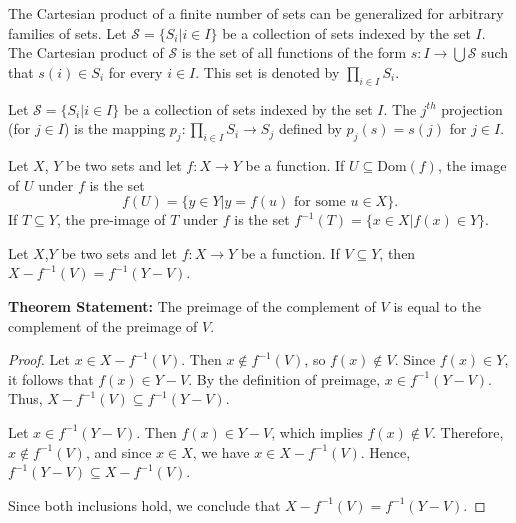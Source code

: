 \documentclass[../main.tex]{subfiles}
\begin{document}
The Cartesian product of a finite number of sets can be generalized for arbitrary families of sets. Let $\mathcal{S}=\{S_i|i\in I\}$ be a collection of sets indexed by the set $I$. The Cartesian product of $\mathcal{S}$ is the set of all functions of the form $s:I\rightarrow \bigcup\mathcal{S}$ such that $s(i)\in S_i$ for every $i\in I$. This set is denoted by $\prod_{i\in I}S_i$.

\begin{purple}
\begin{definition}
Let $\mathcal{S}=\{S_i|i\in I\}$ be a collection of sets indexed by the set $I$. The $j^{th}$ projection (for $j\in I$) is the mapping $p_j:\prod_{i\in I}S_i\rightarrow S_j$ defined by $p_j(s)=s(j)$ for $j\in I$.

Let $X$, $Y$ be two sets and let $f: X\rightarrow Y$ be a function. If $U\subseteq\text{Dom}(f)$, the image of $U$ under $f$ is the set 
$$
f(U)=\{y\in Y|y=f(u)\text{ for some } u\in X\}.
$$
If $T\subseteq Y$, the pre-image of $T$ under $f$ is the set $f^{-1}(T)=\{x\in X|f(x)\in Y\}$.
\end{definition}
\end{purple}

\begin{yellow}
\begin{theorem}
Let $X$,$Y$ be two sets and let $f:X\rightarrow Y$ be a function. If $V\subseteq Y$, then $X-f^{-1}(V)=f^{-1}(Y-V)$.
\end{theorem}
\end{yellow}

\begin{green}
    
\textbf{Theorem Statement: } The preimage of the complement of $V$ is equal to the complement of the preimage of $V$.

\end{green}


\begin{proof}
    
Let $x \in X - f^{-1}(V)$. Then $x \notin f^{-1}(V)$, so $f(x) \notin V$. Since $f(x) \in Y$, it follows that $f(x) \in Y - V$. By the definition of preimage, $x \in f^{-1}(Y - V)$. Thus, $X - f^{-1}(V) \subseteq f^{-1}(Y - V)$.

Let $x \in f^{-1}(Y - V)$. Then $f(x) \in Y - V$, which implies $f(x) \notin V$. Therefore, $x \notin f^{-1}(V)$, and since $x \in X$, we have $x \in X - f^{-1}(V)$. Hence, $f^{-1}(Y - V) \subseteq X - f^{-1}(V)$.

Since both inclusions hold, we conclude that $X - f^{-1}(V) = f^{-1}(Y - V)$.

\end{proof}
\end{document}
